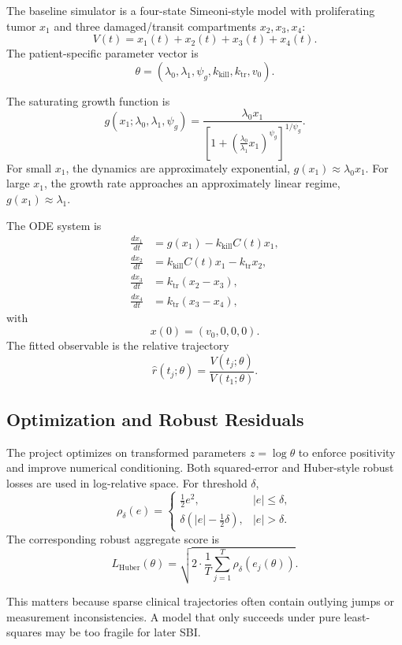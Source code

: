 \documentclass[11pt,a4paper]{article}
\begin{document}
The baseline simulator is a four-state Simeoni-style model with proliferating tumor $x_1$ and three damaged/transit compartments $x_2,x_3,x_4$:
\[
    V(t)=x_1(t)+x_2(t)+x_3(t)+x_4(t).
\]
The patient-specific parameter vector is
\[
    \theta=(\lambda_0,\lambda_1,\psi_g,k_{\mathrm{kill}},k_{\mathrm{tr}},v_0).
\]

The saturating growth function is
\[
    g(x_1;\lambda_0,\lambda_1,\psi_g)
    =
    \frac{\lambda_0 x_1}
    {\left[1+\left(\frac{\lambda_0}{\lambda_1}x_1\right)^{\psi_g}\right]^{1/\psi_g}}.
\]
For small $x_1$, the dynamics are approximately exponential, $g(x_1)\approx\lambda_0x_1$. For large $x_1$, the growth rate approaches an approximately linear regime, $g(x_1)\approx\lambda_1$.

The ODE system is
\[
\begin{aligned}
    \frac{dx_1}{dt}
    &=g(x_1)-k_{\mathrm{kill}}C(t)x_1,\\
    \frac{dx_2}{dt}
    &=k_{\mathrm{kill}}C(t)x_1-k_{\mathrm{tr}}x_2,\\
    \frac{dx_3}{dt}
    &=k_{\mathrm{tr}}(x_2-x_3),\\
    \frac{dx_4}{dt}
    &=k_{\mathrm{tr}}(x_3-x_4),
\end{aligned}
\]
with
\[
    x(0)=(v_0,0,0,0).
\]
The fitted observable is the relative trajectory
\[
    \widehat r(t_j;\theta)=\frac{V(t_j;\theta)}{V(t_1;\theta)}.
\]

\subsection{Optimization and Robust Residuals}

The project optimizes on transformed parameters $z=\log\theta$ to enforce positivity and improve numerical conditioning. Both squared-error and Huber-style robust losses are used in log-relative space. For threshold $\delta$,
\[
    \rho_\delta(e)=
    \begin{cases}
        \frac{1}{2}e^2, & |e|\leq\delta,\\
        \delta\left(|e|-\frac{1}{2}\delta\right), & |e|>\delta.
    \end{cases}
\]
The corresponding robust aggregate score is
\[
    L_{\mathrm{Huber}}(\theta)
    =
    \sqrt{2\cdot\frac{1}{T}\sum_{j=1}^{T}\rho_\delta(e_j(\theta))}.
\]

This matters because sparse clinical trajectories often contain outlying jumps or measurement inconsistencies. A model that only succeeds under pure least-squares may be too fragile for later SBI.
\end{document}
